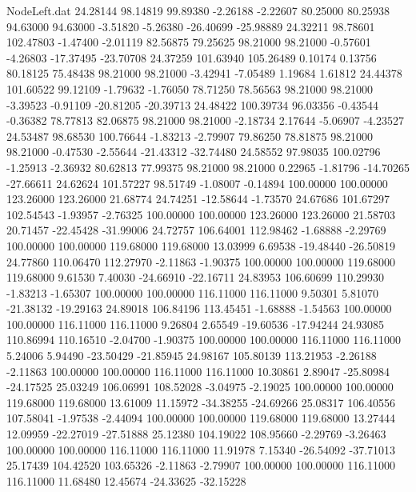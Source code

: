 \begin{filecontents}{NodeLeft.dat}
  24.28144   98.14819   99.89380    -2.26188   -2.22607   80.25000   80.25938   94.63000   94.63000   -3.51820   -5.26380  -26.40699  -25.98889
  24.32211   98.78601  102.47803    -1.47400   -2.01119   82.56875   79.25625   98.21000   98.21000   -0.57601   -4.26803  -17.37495  -23.70708
  24.37259  101.63940  105.26489     0.10174    0.13756   80.18125   75.48438   98.21000   98.21000   -3.42941   -7.05489    1.19684    1.61812
  24.44378  101.60522   99.12109    -1.79632   -1.76050   78.71250   78.56563   98.21000   98.21000   -3.39523   -0.91109  -20.81205  -20.39713
  24.48422  100.39734   96.03356    -0.43544   -0.36382   78.77813   82.06875   98.21000   98.21000   -2.18734    2.17644   -5.06907   -4.23527
  24.53487   98.68530  100.76644    -1.83213   -2.79907   79.86250   78.81875   98.21000   98.21000   -0.47530   -2.55644  -21.43312  -32.74480
  24.58552   97.98035  100.02796    -1.25913   -2.36932   80.62813   77.99375   98.21000   98.21000    0.22965   -1.81796  -14.70265  -27.66611
  24.62624  101.57227   98.51749    -1.08007   -0.14894  100.00000  100.00000  123.26000  123.26000   21.68774   24.74251  -12.58644   -1.73570
  24.67686  101.67297  102.54543    -1.93957   -2.76325  100.00000  100.00000  123.26000  123.26000   21.58703   20.71457  -22.45428  -31.99006
  24.72757  106.64001  112.98462    -1.68888   -2.29769  100.00000  100.00000  119.68000  119.68000   13.03999    6.69538  -19.48440  -26.50819
  24.77860  110.06470  112.27970    -2.11863   -1.90375  100.00000  100.00000  119.68000  119.68000    9.61530    7.40030  -24.66910  -22.16711
  24.83953  106.60699  110.29930    -1.83213   -1.65307  100.00000  100.00000  116.11000  116.11000    9.50301    5.81070  -21.38132  -19.29163
  24.89018  106.84196  113.45451    -1.68888   -1.54563  100.00000  100.00000  116.11000  116.11000    9.26804    2.65549  -19.60536  -17.94244
  24.93085  110.86994  110.16510    -2.04700   -1.90375  100.00000  100.00000  116.11000  116.11000    5.24006    5.94490  -23.50429  -21.85945
  24.98167  105.80139  113.21953    -2.26188   -2.11863  100.00000  100.00000  116.11000  116.11000   10.30861    2.89047  -25.80984  -24.17525
  25.03249  106.06991  108.52028    -3.04975   -2.19025  100.00000  100.00000  119.68000  119.68000   13.61009   11.15972  -34.38255  -24.69266
  25.08317  106.40556  107.58041    -1.97538   -2.44094  100.00000  100.00000  119.68000  119.68000   13.27444   12.09959  -22.27019  -27.51888
  25.12380  104.19022  108.95660    -2.29769   -3.26463  100.00000  100.00000  116.11000  116.11000   11.91978    7.15340  -26.54092  -37.71013
  25.17439  104.42520  103.65326    -2.11863   -2.79907  100.00000  100.00000  116.11000  116.11000   11.68480   12.45674  -24.33625  -32.15228

\end{filecontents}
